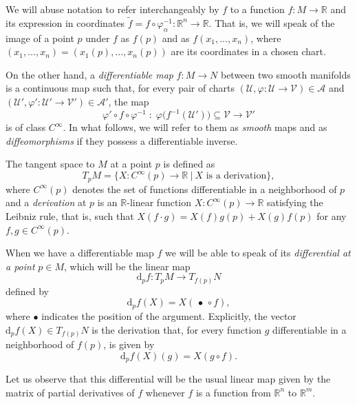 We will abuse notation to refer interchangeably by $f$ to a function $f:M\to \mathbb{R}$ and its expression in coordinates $\tilde{f} = f\circ\varphi_{\alpha}^{-1} : \mathbb{R}^n \to \mathbb{R}$. That is, we will speak of the image of a point $p$ under $f$ as $f(p)$ and as $f(x_1,\dots,x_n)$, where $(x_1,\dots,x_n)=(x_1(p),\dots,x_n(p))$ are its coordinates in a chosen chart.

\bigskip

On the other hand, a \textit{differentiable map} $f \colon M \to N$ between two smooth manifolds is a continuous map such that, for every pair of charts
$(\mathcal{U},\varphi \colon \mathcal{U} \to \mathcal{V}) \in \mathcal{A}$ and $(\mathcal{U}',\varphi' \colon \mathcal{U}' \to \mathcal{V}') \in \mathcal{A}'$, the map
\[
\varphi' \circ f \circ \varphi^{-1}
\;:\;
\varphi\bigl(f^{-1}(\mathcal{U}')\bigr) \subseteq \mathcal{V}
\longrightarrow \mathcal{V}'
\]
is of class $C^\infty$. In what follows, we will refer to them as \textit{smooth} maps and as \textit{diffeomorphisms} if they possess a differentiable inverse.

\bigskip

The tangent space to $M$ at a point $p$ is defined as
\begin{equation*}
  T_pM=\{X:C^{\infty}(p)\to \mathbb{R} ~|~ X \text{ is a derivation} \},
\end{equation*}
where $C^{\infty}(p)$ denotes the set of functions differentiable in a neighborhood of $p$ and a \textit{derivation} at $p$ is an $\mathbb{R}$-linear function $X:C^{\infty}(p)\to\mathbb{R}$ satisfying the Leibniz rule, that is, such that $X(f\cdot g)=X(f)g(p) + X(g)f(p)$ for any $f,g\in C^{\infty}(p)$.

When we have a differentiable map $f$ we will be able to speak of its \textit{differential at a point} $p \in M$, which will be the linear map
\[
\mathrm d_p f \colon T_p M \longrightarrow T_{f(p)} N
\]
defined by
\[
\mathrm d_p f(X) = X(\,\bullet\, \circ f),
\]
where $\bullet$ indicates the position of the argument. Explicitly, the vector $\mathrm d_p f(X) \in T_{f(p)}N$ is the derivation that, for every function $g$ differentiable in a neighborhood of $f(p)$, is given by
\[
\mathrm d_p f(X)(g) = X(g \circ f).
\]

Let us observe that this differential will be the usual linear map given by the matrix of partial derivatives of $f$ whenever $f$ is a function from $\mathbb{R}^n$ to $\mathbb{R}^m$.

\bigskip

